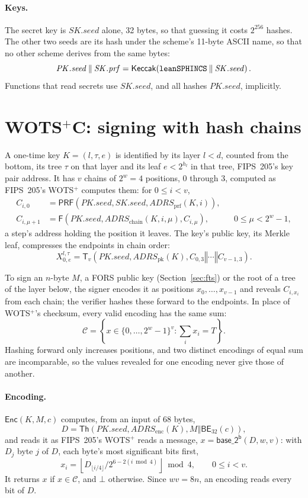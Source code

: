 \documentclass[11pt]{article}
\newcommand{\keccak}{\mathsf{Keccak}}
\newcommand{\Th}{\mathsf{Th}}
\newcommand{\PRF}{\mathsf{PRF}}
\newcommand{\Enc}{\mathsf{Enc}}
\newcommand{\BE}{\mathsf{BE}}
\newcommand{\basetwo}{\mathsf{base\_2^b}}
\newcommand{\concat}{\mathbin\Vert}
\newcommand{\pkseed}{\mathit{PK.seed}}
\newcommand{\skseed}{\mathit{SK.seed}}
\newcommand{\skprf}{\mathit{SK.prf}}
\newcommand{\addr}{\mathit{ADRS}}
\begin{document}
\paragraph{Keys.}
\label{sec:keys}
The secret key is $\skseed$ alone, 32 bytes, so that guessing it costs $2^{256}$ hashes. The other two seeds are its hash under the scheme's 11-byte ASCII name, so that no other scheme derives from the same bytes:
\[
  \pkseed\concat\skprf=\keccak\!\left(\text{\texttt{leanSPHINCS}}\concat\skseed\right).
\]
Functions that read secrets use $\skseed$, and all hashes $\pkseed$, implicitly.

\section{\texorpdfstring{WOTS$^+$C}{WOTS+C}: signing with hash chains}
\label{sec:ots}

A one-time key $K=(l,\tau,e)$ is identified by its layer $l<d$, counted from the bottom, its tree $\tau$ on that layer and its leaf $e<2^{h_l}$ in that tree, FIPS~205's key pair address. It has $v$ chains of $2^w=4$ positions, $0$ through $3$, computed as FIPS~205's WOTS$^+$ computes them: for $0\leq i<v$,
\[
\begin{aligned}
  C_{i,0}&=\PRF\!\left(\pkseed,\skseed,\addr_{\mathrm{prf}}(K,i)\right),\\
  C_{i,\mu+1}&=\mathsf F\!\left(\pkseed,\addr_{\mathrm{chain}}(K,i,\mu),C_{i,\mu}\right),
    &&0\leq\mu<2^w-1,
\end{aligned}
\]
a step's address holding the position it leaves. The key's public key, its Merkle leaf, compresses the endpoints in chain order:
\[
  X^{l,\tau}_{0,e}=\mathsf T_v\!\left(\pkseed,\addr_{\mathrm{pk}}(K),C_{0,3}\concat\cdots\concat C_{v-1,3}\right).
\]

To sign an $n$-byte $M$, a FORS public key (Section~\ref{sec:fts}) or the root of a tree of the layer below, the signer encodes it as positions $x_0,\ldots,x_{v-1}$ and reveals $C_{i,x_i}$ from each chain; the verifier hashes these forward to the endpoints. In place of WOTS$^+$'s checksum, every valid encoding has the same sum:
\[
  \mathcal C=\left\{x\in\{0,\ldots,2^w-1\}^{v}:\textstyle\sum_{i}x_i=T\right\}.
\]
Hashing forward only increases positions, and two distinct encodings of equal sum are incomparable, so the values revealed for one encoding never give those of another.

\paragraph{Encoding.}
$\Enc(K,M,c)$ computes, from an input of 68 bytes,
\[
  D=\Th\!\left(\pkseed,\addr_{\mathrm{enc}}(K),M\concat\BE_{32}(c)\right),
\]
and reads it as FIPS~205's WOTS$^+$ reads a message, $x=\basetwo(D,w,v)$: with $D_j$ byte $j$ of $D$, each byte's most significant bits first,
\[
  x_i=\left\lfloor D_{\lfloor i/4\rfloor}/2^{6-2(i\bmod4)}\right\rfloor\bmod 4,\qquad 0\leq i<v.
\]
It returns $x$ if $x\in\mathcal C$, and $\bot$ otherwise. Since $wv=8n$, an encoding reads every bit of $D$.
\end{document}
